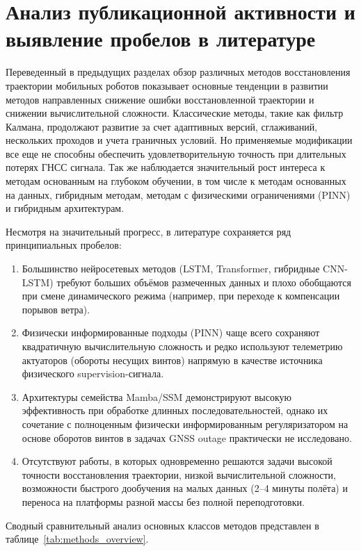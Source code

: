\section{Анализ публикационной активности и выявление пробелов в литературе}
\label{sec:1.8}

Переведенный в предыдущих разделах обзор различных методов восстановления траектории мобильных роботов показывает основные тенденции в развитии методов направленных снижение ошибки восстановленной траектории и снижении вычислительной сложности. Классические методы, такие как фильтр Калмана, продолжают развитие за счет адаптивных версий, сглаживаний, нескольких проходов и учета граничных условий. Но применяемые модификации все еще не способны обеспечить удовлетворительную точность при длительных потерях ГНСС сигнала. Так же наблюдается значительный рост интереса к методам основанным на глубоком обучении, в том числе к методам основанных на данных, гибридным методам, методам с физическими ограничениями (PINN) и гибридным архитектурам. 

Несмотря на значительный прогресс, в литературе сохраняется ряд принципиальных пробелов:

\begin{enumerate}
	\item Большинство нейросетевых методов (LSTM, Transformer, гибридные CNN-LSTM) требуют больших объёмов размеченных данных и плохо обобщаются при смене динамического режима (например, при переходе к компенсации порывов ветра).
	\item Физически информированные подходы (PINN) чаще всего сохраняют квадратичную вычислительную сложность и редко используют телеметрию актуаторов (обороты несущих винтов) напрямую в качестве источника физического supervision-сигнала.
	\item Архитектуры семейства Mamba/SSM демонстрируют высокую эффективность при обработке длинных последовательностей, однако их сочетание с полноценным физически информированным регуляризатором на основе оборотов винтов в задачах GNSS outage практически не исследовано.
	\item Отсутствуют работы, в которых одновременно решаются задачи высокой точности восстановления траектории, низкой вычислительной сложности, возможности быстрого дообучения на малых данных (2–4 минуты полёта) и переноса на платформы разной массы без полной переподготовки.
\end{enumerate}

Сводный сравнительный анализ основных классов методов представлен в таблице~\ref{tab:methods_overview}.

